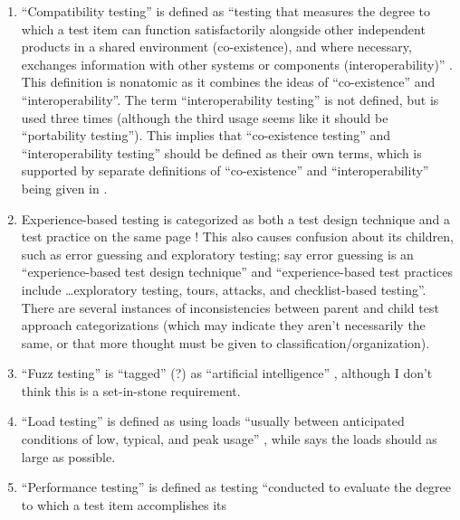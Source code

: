 \begin{enumerate}
      \item ``Compatibility testing'' is defined as ``testing that measures the
            degree to which a test item can function satisfactorily alongside
            other independent products in a shared environment (co-existence),
            and where necessary, exchanges information with other systems or
            components (interoperability)'' \cite[p.~3]{IEEE2022}. This
            definition is nonatomic as it combines the ideas of ``co-existence''
            and ``interoperability''. The term ``interoperability testing'' is
            not defined, but is used three times \cite[pp.~22, 43]{IEEE2022}
            (although the third usage seems like it should be ``portability
            testing''). This implies that ``co-existence testing'' and
            ``interoperability testing'' should be defined as their own terms,
            which is supported by separate definitions of ``co-existence'' and
            ``interoperability'' being given in \cite{ISTQB}.
      \item Experience-based testing is categorized as both a test design
            technique and a test practice on the same page
            \citep[p.~22]{IEEE2022}! This also causes confusion about
            its children, such as error guessing and exploratory testing;
            \citet[p.~34]{IEEE2022} say error guessing is an ``experience-based
            test design technique'' and ``experience-based test practices
            include \dots exploratory testing, tours, attacks, and
            checklist-based testing''. There are several instances of
            inconsistencies between parent and child test approach
            categorizations (which may indicate they aren't necessarily the
            same, or that more thought must be given to
            classification/organization).
      \item ``Fuzz testing'' is ``tagged'' (?) as ``artificial intelligence''
            \cite[p.~5]{IEEE2022}, although I don't think this is a
            set-in-stone requirement.
      \item ``Load testing'' is defined as using loads ``usually between
            anticipated conditions of low, typical, and peak usage''
            \cite[p.~5]{IEEE2022}, while \citet[p.~86]{Patton2006} says the
            loads should as large as possible.
      \item ``Performance testing'' is defined as testing ``conducted to
            evaluate the degree to which a test item accomplishes its

\end{enumerate}
